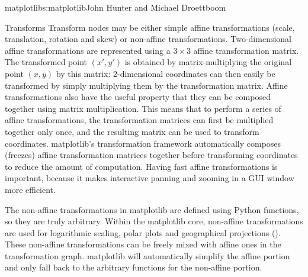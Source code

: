 \begin{aosachapter}{matplotlib}{s:matplotlib}{John Hunter and Michael Droettboom}
\begin{aosasect1}{Transforms}
Transform nodes may be either simple affine transformations (scale,
translation, rotation and skew) or non-affine transformations.
Two-dimensional affine transformations are represented using a $3
\times 3$ affine transformation matrix.  The transformed point
$(x\prime, y\prime)$ is obtained by matrix-multiplying the original
point $(x, y)$ by this matrix:
2-dimensional coordinates can then easily be transformed by simply
multiplying them by the transformation matrix.  Affine transformations
also have the useful property that they can be composed together using
matrix multiplication.  This means that to perform a series of affine
transformations, the transformation matrices can first be multiplied
together only once, and the resulting matrix can be used to transform
coordinates.  matplotlib's transformation framework automatically
composes (freezes) affine transformation matrices together before
transforming coordinates to reduce the amount of computation.  Having
fast affine transformations is important, because it makes interactive
panning and zooming in a GUI window more efficient.

The non-affine transformations in matplotlib are defined using Python
functions, so they are truly arbitrary.  Within the matplotlib core,
non-affine transformations are used for logarithmic scaling, polar
plots and geographical projections ().  These non-affine transformations can
be freely mixed with affine ones in the transformation graph.
matplotlib will automatically simplify the affine portion and only
fall back to the arbitrary functions for the non-affine portion.



\end{aosasect1}
\end{aosachapter}
